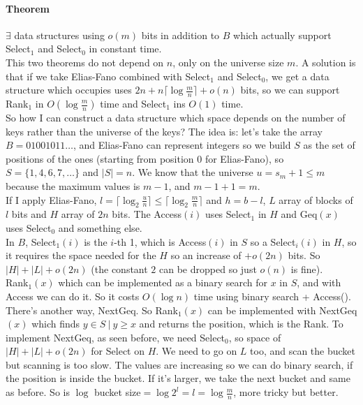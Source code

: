 \documentclass[10pt]{report}
\begin{document}
\paragraph{Theorem} $\exists$ data structures using $o(m)$ bits in addition to $B$ which actually support Select$_1$ and Select$_0$ in constant time.\\
This two theorems do not depend on $n$, only on the universe size $m$. A solution is that if we take Elias-Fano combined with Select$_1$ and Select$_0$, we get a data structure which occupies uses $2n + n \lceil \log \frac{m}{n}\rceil+o(n)$ bits, so we can support Rank$_1$ in $O(\log\frac{m}{n})$ time and Select$_1$ ins $O(1)$ time.\\
So how I can construct a data structure which space depends on the number of keys rather than the universe of the keys? The idea is: let's take the array $B = 01001011\ldots$, and Elias-Fano can represent integers so we build $S$ as the set of positions of the ones (starting from position $0$ for Elias-Fano), so $S=\{1,4,6,7,\ldots\}$ and $|S|=n$. We know that the universe $u = s_m + 1 \leq m$ because the maximum values is $m-1$, and $m-1+1=m$.\\
If I apply Elias-Fano, $l=\lceil\log_2\frac{u}{n}\rceil \leq \lceil\log_2\frac{m}{n}\rceil$ and $h = b - l$, $L$ array of blocks of $l$ bits and $H$ array of $2n$ bits. The Access$(i)$ uses Select$_1$ in $H$ and Geq$(x)$ uses Select$_0$ and something else.\\
In $B$, Select$_1(i)$ is the $i$-th 1, which is Access$(i)$ in $S$ so a Select$_i(i)$ in $H$, so it requires the space needed for the $H$ so an increase of $+o(2n)$ bits. So $|H|+|L| + o(2n)$ (the constant $2$ can be dropped so just $o(n)$ is fine).\\
Rank$_1(x)$ which can be implemented as a binary search for $x$ in $S$, and with Access we can do it. So it costs $O(\log n)$ time using binary search + Access(). There's another way, NextGeq. So Rank$_1(x)$ can be implemented with NextGeq$(x)$ which finds $y\in S\:|\:y\geq x$ and returns the position, which is the Rank. To implement NextGeq, as seen before, we need Select$_0$, so space of $|H|+|L|+o(2n)$ for Select on $H$. We need to go on $L$ too, and scan the bucket but scanning is too slow. The values are increasing so we can do binary search, if the position is inside the bucket. If it's larger, we take the next bucket and same as before. So is $\log$ bucket size$=\log 2^l = l = \log\frac{m}{n}$, more tricky but better.
\end{document}
